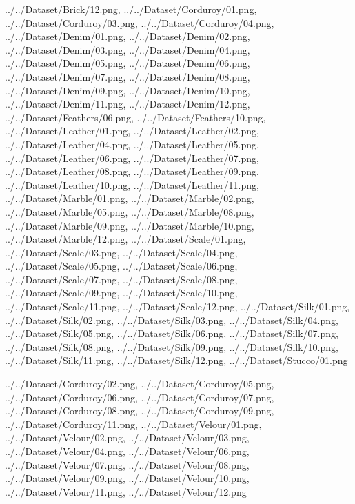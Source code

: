 \documentclass[12pt,a4paper]{article}
\begin{document}
\begin{singlespace}
\newpage
{}
{../../Dataset/Brick/12.png,
../../Dataset/Corduroy/01.png,
../../Dataset/Corduroy/03.png,
../../Dataset/Corduroy/04.png,
../../Dataset/Denim/01.png,
../../Dataset/Denim/02.png,
../../Dataset/Denim/03.png,
../../Dataset/Denim/04.png,
../../Dataset/Denim/05.png,
../../Dataset/Denim/06.png,
../../Dataset/Denim/07.png,
../../Dataset/Denim/08.png,
../../Dataset/Denim/09.png,
../../Dataset/Denim/10.png,
../../Dataset/Denim/11.png,
../../Dataset/Denim/12.png,
../../Dataset/Feathers/06.png,
../../Dataset/Feathers/10.png,
../../Dataset/Leather/01.png,
../../Dataset/Leather/02.png,
../../Dataset/Leather/04.png,
../../Dataset/Leather/05.png,
../../Dataset/Leather/06.png,
../../Dataset/Leather/07.png,
../../Dataset/Leather/08.png,
../../Dataset/Leather/09.png,
../../Dataset/Leather/10.png,
../../Dataset/Leather/11.png,
../../Dataset/Marble/01.png,
../../Dataset/Marble/02.png,
../../Dataset/Marble/05.png,
../../Dataset/Marble/08.png,
../../Dataset/Marble/09.png,
../../Dataset/Marble/10.png,
../../Dataset/Marble/12.png,
../../Dataset/Scale/01.png,
../../Dataset/Scale/03.png,
../../Dataset/Scale/04.png,
../../Dataset/Scale/05.png,
../../Dataset/Scale/06.png,
../../Dataset/Scale/07.png,
../../Dataset/Scale/08.png,
../../Dataset/Scale/09.png,
../../Dataset/Scale/10.png,
../../Dataset/Scale/11.png,
../../Dataset/Scale/12.png,
../../Dataset/Silk/01.png,
../../Dataset/Silk/02.png,
../../Dataset/Silk/03.png,
../../Dataset/Silk/04.png,
../../Dataset/Silk/05.png,
../../Dataset/Silk/06.png,
../../Dataset/Silk/07.png,
../../Dataset/Silk/08.png,
../../Dataset/Silk/09.png,
../../Dataset/Silk/10.png,
../../Dataset/Silk/11.png,
../../Dataset/Silk/12.png,
../../Dataset/Stucco/01.png}

{../../Dataset/Corduroy/02.png,
../../Dataset/Corduroy/05.png,
../../Dataset/Corduroy/06.png,
../../Dataset/Corduroy/07.png,
../../Dataset/Corduroy/08.png,
../../Dataset/Corduroy/09.png,
../../Dataset/Corduroy/11.png,
../../Dataset/Velour/01.png,
../../Dataset/Velour/02.png,
../../Dataset/Velour/03.png,
../../Dataset/Velour/04.png,
../../Dataset/Velour/06.png,
../../Dataset/Velour/07.png,
../../Dataset/Velour/08.png,
../../Dataset/Velour/09.png,
../../Dataset/Velour/10.png,
../../Dataset/Velour/11.png,
../../Dataset/Velour/12.png}


\end{singlespace}
\end{document}
